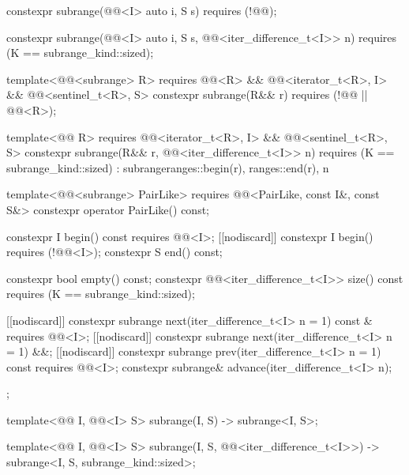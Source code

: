 \begin{codeblock}
{{    constexpr subrange(@@<I> auto i, S s) requires (!@@);

    constexpr subrange(@@<I> auto i, S s,
                       @@<iter_difference_t<I>> n)
      requires (K == subrange_kind::sized);

    template<@@<subrange> R>
      requires @@<R> &&
               @@<iterator_t<R>, I> &&
               @@<sentinel_t<R>, S>
    constexpr subrange(R&& r) requires (!@@ || @@<R>);

    template<@@ R>
      requires @@<iterator_t<R>, I> &&
               @@<sentinel_t<R>, S>
    constexpr subrange(R&& r, @@<iter_difference_t<I>> n)
      requires (K == subrange_kind::sized)
        : subrange{ranges::begin(r), ranges::end(r), n}
    {}

    template<@@<subrange> PairLike>
      requires @@<PairLike, const I&, const S&>
    constexpr operator PairLike() const;

    constexpr I begin() const requires @@<I>;
    [[nodiscard]] constexpr I begin() requires (!@@<I>);
    constexpr S end() const;

    constexpr bool empty() const;
    constexpr @@<iter_difference_t<I>> size() const
      requires (K == subrange_kind::sized);

    [[nodiscard]] constexpr subrange next(iter_difference_t<I> n = 1) const &
      requires @@<I>;
    [[nodiscard]] constexpr subrange next(iter_difference_t<I> n = 1) &&;
    [[nodiscard]] constexpr subrange prev(iter_difference_t<I> n = 1) const
      requires @@<I>;
    constexpr subrange& advance(iter_difference_t<I> n);
  };

  template<@@ I, @@<I> S>
    subrange(I, S) -> subrange<I, S>;

  template<@@ I, @@<I> S>
    subrange(I, S, @@<iter_difference_t<I>>) ->
      subrange<I, S, subrange_kind::sized>;

}
\end{codeblock}
